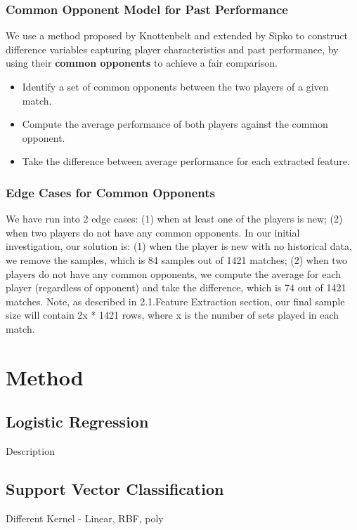 \documentclass[paper=a4, fontsize=11pt]{scrartcl} %
\numberwithin{equation}{section} %
\numberwithin{figure}{section} %
\numberwithin{table}{section} %
\begin{document}
\subsubsection{Common Opponent Model for Past Performance}
We use a method proposed by Knottenbelt \cite{KNOTTENBELT20123820} and extended by Sipko \cite{tennis1} to construct difference variables capturing player characteristics and past performance, by using their \textbf{common opponents} to achieve a fair comparison. 
\begin{itemize}
\item Identify a set of common opponents between the two players of a given match.
\item Compute the average performance of both players against the common opponent.
\item Take the difference between average performance for each extracted feature.
\end{itemize}
\subsubsection{Edge Cases for Common Opponents}
We have run into 2 edge cases: (1) when at least one of the players is new; (2) when two players do not have any common opponents.  In our initial investigation, our solution is: (1) when the player is new with no historical data, we remove the samples, which is 84 samples out of 1421 matches; (2) when two players do not have any common opponents, we compute the average for each player (regardless of opponent) and take the difference, which is 74 out of 1421 matches. Note, as described in 2.1.Feature Extraction section, our final sample size will contain 2x * 1421 rows, where x is the number of sets played in each match.

\section{Method}
\subsection{Logistic Regression}
Description
\subsection{Support Vector Classification}
Different Kernel - Linear, RBF, poly
\end{document}
